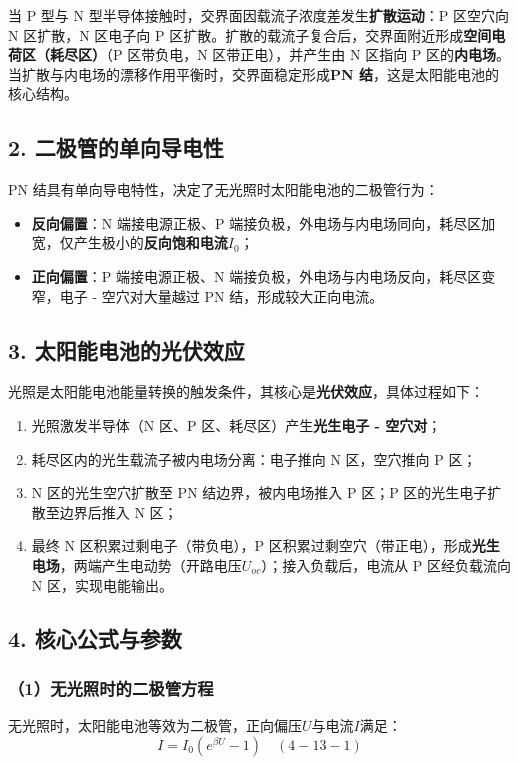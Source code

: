 \documentclass[12pt]{article}
\begin{document}
当 P 型与 N 型半导体接触时，交界面因载流子浓度差发生\textbf{扩散运动}：P 区空穴向 N 区扩散，N 区电子向 P 区扩散。扩散的载流子复合后，交界面附近形成\textbf{空间电荷区（耗尽区）}（P 区带负电，N 区带正电），并产生由 N 区指向 P 区的\textbf{内电场}。当扩散与内电场的漂移作用平衡时，交界面稳定形成\textbf{PN 结}，这是太阳能电池的核心结构。

\subsection{2. 二极管的单向导电性}
PN 结具有单向导电特性，决定了无光照时太阳能电池的二极管行为：
\begin{itemize}
  \item \textbf{反向偏置}：N 端接电源正极、P 端接负极，外电场与内电场同向，耗尽区加宽，仅产生极小的\textbf{反向饱和电流$I_0$}；
  \item \textbf{正向偏置}：P 端接电源正极、N 端接负极，外电场与内电场反向，耗尽区变窄，电子 - 空穴对大量越过 PN 结，形成较大正向电流。
\end{itemize}

\subsection{3. 太阳能电池的光伏效应}
光照是太阳能电池能量转换的触发条件，其核心是\textbf{光伏效应}，具体过程如下：
\begin{enumerate}
  \item 光照激发半导体（N 区、P 区、耗尽区）产生\textbf{光生电子 - 空穴对}；
  \item 耗尽区内的光生载流子被内电场分离：电子推向 N 区，空穴推向 P 区；
  \item N 区的光生空穴扩散至 PN 结边界，被内电场推入 P 区；P 区的光生电子扩散至边界后推入 N 区；
  \item 最终 N 区积累过剩电子（带负电），P 区积累过剩空穴（带正电），形成\textbf{光生电场}，两端产生电动势（开路电压$U_{oc}$）；接入负载后，电流从 P 区经负载流向 N 区，实现电能输出。
\end{enumerate}

\subsection{4. 核心公式与参数}
\subsubsection{（1）无光照时的二极管方程}
无光照时，太阳能电池等效为二极管，正向偏压$U$与电流$I$满足：
\begin{equation}
I = I_0 \left( e^{\beta U} - 1 \right) \quad (4-13-1)
\end{equation}
\end{document}
